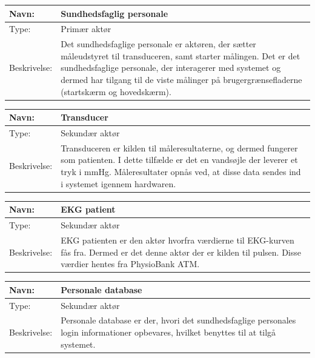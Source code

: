 \begin{table}[h!]
\begin{tabular}{| >{\raggedright\arraybackslash}p{3cm} | >{\raggedright\arraybackslash}p{12cm} |}
   \hline
   Navn: & Sundhedsfaglig personale\\ \hline
   Type: & Primær aktør \\ \hline
   Beskrivelse: & Det sundhedsfaglige personale er aktøren, der sætter måleudstyret til transduceren, samt starter målingen. Det er det sundhedsfaglige personale, der interagerer med systemet og dermed har tilgang til de viste målinger på brugergrænsefladerne (startskærm og hovedskærm).\\ \hline
\end{tabular}
\end{table}


\begin{table}[h!]
\begin{tabular}{| >{\raggedright\arraybackslash}p{3cm} | >{\raggedright\arraybackslash}p{12cm} |}
   \hline
   Navn: & Transducer\\ \hline
   Type: & Sekundær aktør \\ \hline
   Beskrivelse: & Transduceren er kilden til måleresultaterne, og dermed fungerer som patienten. I dette tilfælde er det en vandsøjle der leverer et tryk i mmHg. Måleresultater opnås ved, at disse data sendes ind i systemet igennem hardwaren.\\ \hline
\end{tabular}
\end{table}

\begin{table}[h!]
\begin{tabular}{| >{\raggedright\arraybackslash}p{3cm} | >{\raggedright\arraybackslash}p{12cm} |}
   \hline
   Navn: & EKG patient\\ \hline
   Type: & Sekundær aktør \\ \hline
   Beskrivelse: & EKG patienten er den aktør hvorfra værdierne til EKG-kurven fås fra. Dermed er det denne aktør der er kilden til pulsen. Disse værdier hentes fra PhysioBank ATM.\\ \hline
\end{tabular}
\end{table}


\begin{table}[h!]
\begin{tabular}{| >{\raggedright\arraybackslash}p{3cm} | >{\raggedright\arraybackslash}p{12cm} |}
   \hline
   Navn: & Personale database\\ \hline
   Type: & Sekundær aktør \\ \hline
   Beskrivelse: & Personale database er der, hvori det sundhedsfaglige personales login informationer opbevares, hvilket benyttes til at tilgå systemet. \\ \hline
\end{tabular}
\end{table}


